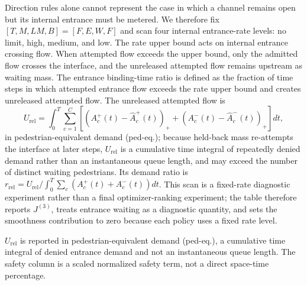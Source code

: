 \documentclass[lettersize,journal]{IEEEtran}
\begin{document}
Direction rules alone cannot represent the case in which a channel remains open but its internal entrance must be metered.
We therefore fix $[T,M,LM,B]=[F,E,W,F]$ and scan four internal entrance-rate levels: no limit, high, medium, and low.
The rate upper bound acts on internal entrance crossing flow.
When attempted flow exceeds the upper bound, only the admitted flow crosses the interface, and the unreleased attempted flow remains upstream as waiting mass.
The entrance binding-time ratio is defined as the fraction of time steps in which attempted entrance flow exceeds the rate upper bound and creates unreleased attempted flow.
The unreleased attempted flow is
\[
U_{\mathrm{rel}}=
\int_0^T\sum_{c=1}^{C}
\left[
(A_c^+(t)-\hat A_c^+(t))_+
+
(A_c^-(t)-\hat A_c^-(t))_+
\right]dt,
\]
in pedestrian-equivalent demand (ped-eq.); because held-back mass re-attempts the interface at later steps, $U_{\mathrm{rel}}$ is a cumulative time integral of repeatedly denied demand rather than an instantaneous queue length, and may exceed the number of distinct waiting pedestrians. Its demand ratio is $r_{\mathrm{rel}}=U_{\mathrm{rel}}/\int_0^T\sum_c(A_c^+(t)+A_c^-(t))dt$.
This scan is a fixed-rate diagnostic experiment rather than a final optimizer-ranking experiment; the table therefore reports $J^{(3)}$, treats entrance waiting as a diagnostic quantity, and sets the smoothness contribution to zero because each policy uses a fixed rate level.

\begin{table}[!t]
\centering
\caption[Response Under Internal Entrance-Rate Upper-Bound Levels]{Response Under Internal Entrance-Rate\\ Upper-Bound Levels}
\label{tab:entrance_rate_response}
\footnotesize
\setlength{\tabcolsep}{2pt}
\par\vspace{3.5mm}
\noindent\parbox{\columnwidth}{\footnotesize $U_{\mathrm{rel}}$ is reported in pedestrian-equivalent demand (ped-eq.), a cumulative time integral of denied entrance demand and not an instantaneous queue length. The safety column is a scaled normalized safety term, not a direct space-time percentage.}
\end{table}
\end{document}
